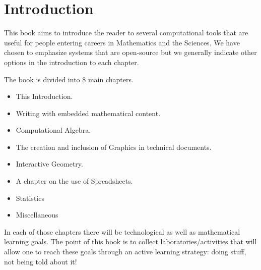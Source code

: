  
\chapter{Introduction}

This book aims to introduce the reader to several computational tools that are useful for people entering careers in Mathematics and the Sciences.  We have chosen to emphasize systems that are open-source but we generally indicate other options in the introduction to each chapter.

The book is divided into 8 main chapters.

\begin{itemize}

\item This Introduction.

\item Writing with embedded mathematical content.

\item Computational Algebra.

\item The creation and inclusion of Graphics in technical documents.

\item Interactive Geometry.

\item A chapter on the use of Spreadsheets.

\item Statistics

\item Miscellaneous

\end{itemize}

In each of those chapters there will be technological as well as mathematical learning goals.  The point of this book is to collect laboratories/activities that will allow one to reach these goals through an active learning strategy: doing stuff, not being told about it! 